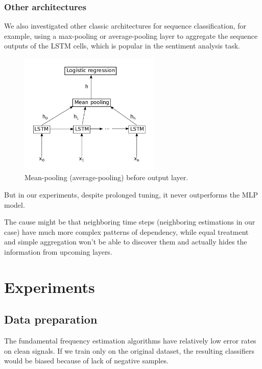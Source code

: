 \documentclass[11pt,a4paper]{report}
\begin{document}
\subsection{Other architectures}

We also investigated other classic architectures for sequence classification, for example, using a max-pooling or average-pooling layer to aggregate the sequence outputs of the LSTM cells, which is popular in the sentiment analysis task.

\begin{figure}[htbp]
  \centering
  \includegraphics[width=0.6\textwidth]{sentiment.png}
  \caption{Mean-pooling (average-pooling) before output layer.} \label{fig:sentiment}
\end{figure}

But in our experiments, despite prolonged tuning, it never outperforms the MLP model.

The cause might be that neighboring time steps (neighboring estimations in our case) have much more complex patterns of dependency, while equal treatment and simple aggregation won't be able to discover them and actually hides the information from upcoming layers.

\chapter{Experiments}

\section{Data preparation}

The fundamental frequency estimation algorithms have relatively low error rates on clean signals.
If we train only on the original dataset, the resulting classifiers would be biased because of lack of negative samples.
\end{document}
